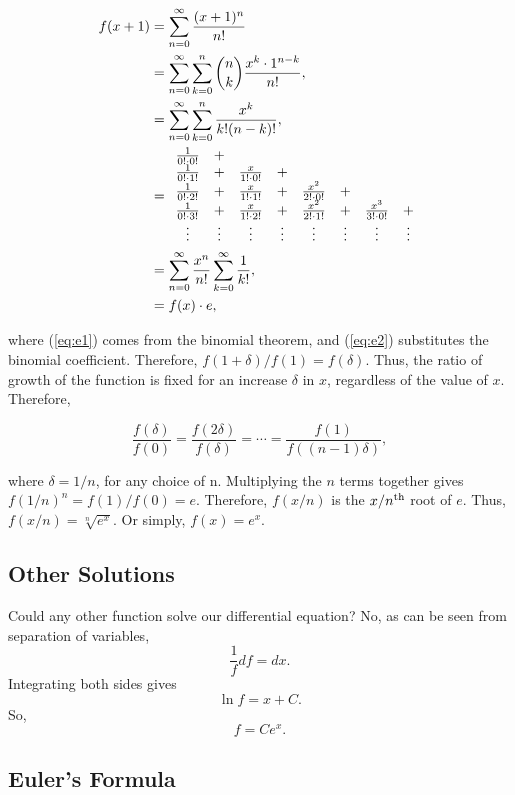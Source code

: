 \documentclass[11pt]{amsart}
\begin{document}
\begin{align}
f(x + 1) &= \sum_{n=0}^{\infty} \frac{(x + 1)^n}{n!} \notag \\
&= \sum_{n=0}^{\infty} \sum_{k=0}^{n}{{n}\choose{k}}\frac{x^k \cdot 1^{n-k}}{n!} \label{eq:e1}, \\
&= \sum_{n=0}^{\infty} \sum_{k=0}^{n}\frac{x^k}{k!(n-k)!} \label{eq:e2}, \\
&= \begin{array}{cccccccc}
\frac{1}{0! \cdot 0!} & + & & & & \\
\frac{1}{0! \cdot 1!} & + & \frac{x}{1! \cdot 0!} & + & & & & \\
\frac{1}{0! \cdot 2!} & + & \frac{x}{1! \cdot 1!} & + & \frac{x^2}{2! \cdot 0!} & + & &\\
\frac{1}{0! \cdot 3!} & + & \frac{x}{1! \cdot 2!} & + & \frac{x^2}{2! \cdot 1!} & + & \frac{x^3}{3! \cdot 0!} & +\\
\vdots & \vdots  & \vdots  &\vdots  & \vdots  & \vdots  & \vdots  & \vdots 
\end{array} \notag \\
&= \sum_{n=0}^{\infty} \frac{x^n}{n!} \sum_{k=0}^{\infty} \frac{1}{k!} \notag, \\
&= f(x) \cdot e \notag,
\end{align}

where (\ref{eq:e1}) comes from the binomial theorem, and (\ref{eq:e2}) substitutes the binomial coefficient. Therefore, $f(1 + \delta) / f(1) = f(\delta)$. Thus, the ratio of growth of the function is fixed for an increase $\delta$ in $x$, regardless of the value of $x$. Therefore,

$$\frac{f(\delta)}{f(0)} = \frac{f(2\delta)}{f(\delta)} = \cdots = \frac{f(1)}{f((n-1)\delta)},$$

where $\delta = 1 / n$, for any choice of n. Multiplying the $n$ terms together gives $f(1/n)^n = f(1) / f(0) = e$. Therefore, $f(x/n)$ is the $x/n\textsuperscript{th}$ root of $e$. Thus, $f(x/n) = \sqrt[n]{e^x}$. Or simply, $f(x) = e^x$.

\subsection{Other Solutions}

Could any other function solve our differential equation? No, as can be seen from separation of variables, $$\frac{1}{f}df = {dx}.$$ Integrating both sides gives $$\ln{f} = x + C.$$ So, $$f = Ce^x.$$

\subsection{Euler's Formula}
\end{document}

